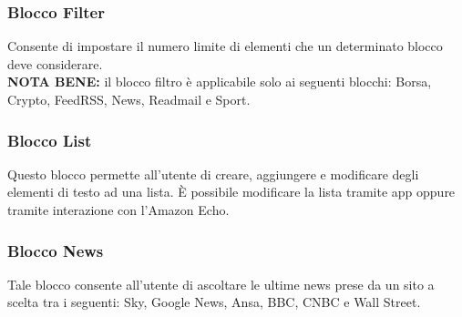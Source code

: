 \subsubsection{Blocco Filter}
Consente di impostare il numero limite di elementi che un determinato blocco deve considerare. \\
\textbf{NOTA BENE:} il blocco filtro è applicabile solo ai seguenti blocchi: Borsa, Crypto, FeedRSS, News, Readmail e Sport.

\subsubsection{Blocco List}
Questo blocco permette all'utente di creare, aggiungere e modificare degli elementi di testo ad una lista.
È possibile modificare la lista tramite app oppure tramite interazione con l'Amazon Echo.

\subsubsection{Blocco News}
Tale blocco consente all'utente di ascoltare le ultime news prese da un sito a scelta tra i seguenti: Sky, Google News, Ansa, BBC, CNBC e Wall Street.

